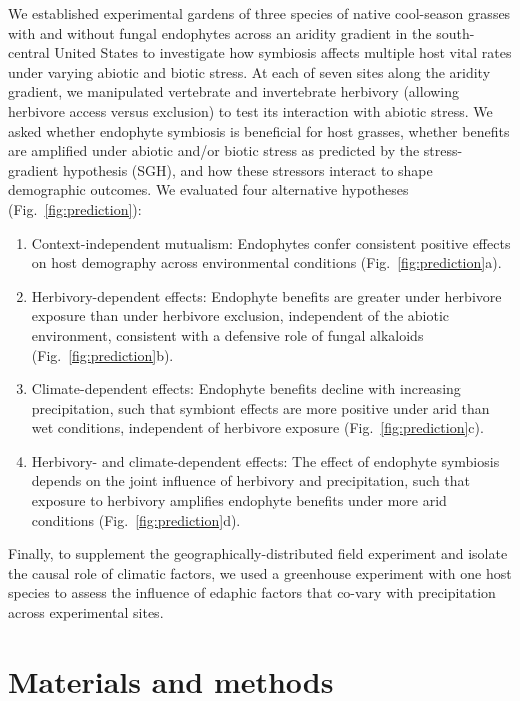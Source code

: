 \documentclass[12pt]{article}\usepackage[]{graphicx}\usepackage[dvipsnames]{xcolor}
\begin{document}
We established experimental gardens of three species of native cool-season grasses with and without fungal endophytes across an aridity gradient in the south-central United States to investigate how symbiosis affects multiple host vital rates under varying abiotic and biotic stress. 
At each of seven sites along the aridity gradient, we manipulated vertebrate and invertebrate herbivory (allowing herbivore access versus exclusion) to test its interaction with abiotic stress.
We asked whether endophyte symbiosis is beneficial for host grasses, whether benefits are amplified under abiotic and/or biotic stress as predicted by the stress-gradient hypothesis (SGH), and how these stressors interact to shape demographic outcomes. 
We evaluated four alternative hypotheses (Fig.~\ref{fig:prediction}):
\begin{enumerate}
\item Context-independent mutualism: Endophytes confer consistent positive effects on host demography across environmental conditions (Fig.~\ref{fig:prediction}a).
\item Herbivory-dependent effects: Endophyte benefits are greater under herbivore exposure than under herbivore exclusion, independent of the abiotic environment, consistent with a defensive role of fungal alkaloids (Fig.~\ref{fig:prediction}b).
\item Climate-dependent effects: Endophyte benefits decline with increasing precipitation, such that symbiont effects are more positive under arid than wet conditions, independent of herbivore exposure (Fig.~\ref{fig:prediction}c).
\item Herbivory- and climate-dependent effects: The effect of endophyte symbiosis depends on the joint influence of herbivory and precipitation, such that exposure to herbivory amplifies endophyte benefits under more arid conditions (Fig.~\ref{fig:prediction}d).
\end{enumerate}
Finally, to supplement the geographically-distributed field experiment and isolate the causal role of climatic factors, we used a greenhouse experiment with one host species to assess the influence of edaphic factors that co-vary with precipitation across experimental sites. 

\section*{Materials and methods}
\end{document}
